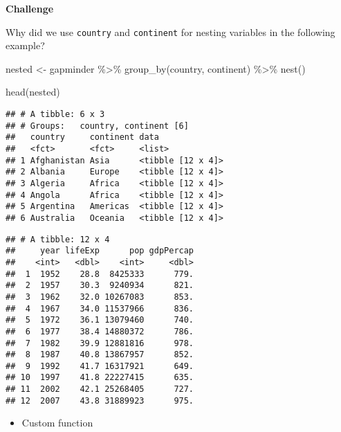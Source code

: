 \documentclass[
]{book}
\newenvironment{Shaded}{\begin{snugshade}}{\end{snugshade}}
\newcommand{\DecValTok}[1]{\textcolor[rgb]{0.00,0.00,0.81}{#1}}
\newcommand{\FunctionTok}[1]{\textcolor[rgb]{0.00,0.00,0.00}{#1}}
\newcommand{\NormalTok}[1]{#1}
\newcommand{\OtherTok}[1]{\textcolor[rgb]{0.56,0.35,0.01}{#1}}
\newcommand{\SpecialCharTok}[1]{\textcolor[rgb]{0.00,0.00,0.00}{#1}}
\providecommand{\tightlist}{%
  \setlength{\itemsep}{0pt}\setlength{\parskip}{0pt}}
\begin{document}
\textbf{Challenge}

Why did we use \texttt{country} and \texttt{continent} for nesting variables in the following example?

\begin{Shaded}
\begin{Highlighting}[]
\NormalTok{nested }\OtherTok{\textless{}{-}}\NormalTok{ gapminder }\SpecialCharTok{\%\textgreater{}\%}
  \FunctionTok{group\_by}\NormalTok{(country, continent) }\SpecialCharTok{\%\textgreater{}\%}
  \FunctionTok{nest}\NormalTok{()}

\FunctionTok{head}\NormalTok{(nested)}
\end{Highlighting}
\end{Shaded}

\begin{verbatim}
## # A tibble: 6 x 3
## # Groups:   country, continent [6]
##   country     continent data             
##   <fct>       <fct>     <list>           
## 1 Afghanistan Asia      <tibble [12 x 4]>
## 2 Albania     Europe    <tibble [12 x 4]>
## 3 Algeria     Africa    <tibble [12 x 4]>
## 4 Angola      Africa    <tibble [12 x 4]>
## 5 Argentina   Americas  <tibble [12 x 4]>
## 6 Australia   Oceania   <tibble [12 x 4]>
\end{verbatim}

\begin{Shaded}
\end{Shaded}

\begin{verbatim}
## # A tibble: 12 x 4
##     year lifeExp      pop gdpPercap
##    <int>   <dbl>    <int>     <dbl>
##  1  1952    28.8  8425333      779.
##  2  1957    30.3  9240934      821.
##  3  1962    32.0 10267083      853.
##  4  1967    34.0 11537966      836.
##  5  1972    36.1 13079460      740.
##  6  1977    38.4 14880372      786.
##  7  1982    39.9 12881816      978.
##  8  1987    40.8 13867957      852.
##  9  1992    41.7 16317921      649.
## 10  1997    41.8 22227415      635.
## 11  2002    42.1 25268405      727.
## 12  2007    43.8 31889923      975.
\end{verbatim}

\begin{itemize}
\tightlist
\item
  Custom function
\end{itemize}
\end{document}
